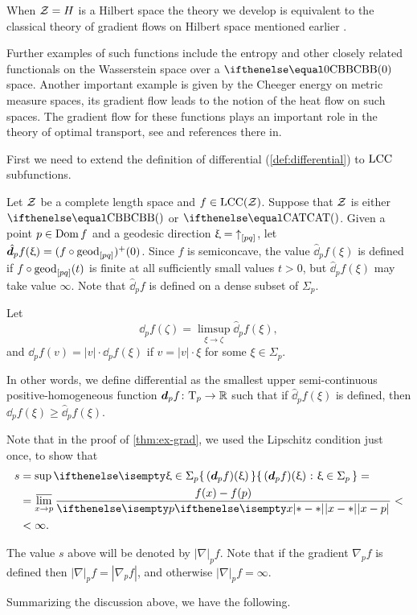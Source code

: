 When $\mathcal{Z}=H$ is a Hilbert space the theory we develop is equivalent to the classical theory of gradient flows on Hilbert space mentioned earlier \cite{Brezis-book}.

Further examples of such functions include the entropy and other closely related functionals on the Wasserstein space over a $\Alex0$ space.
Another important example is given by the Cheeger energy on metric measure spaces, its gradient flow leads to the notion of the heat flow on such spaces.
The gradient flow for these functions plays an important role in the theory of optimal transport, see \cite{villani} and references there in. 


First we need to extend the definition of differential (\ref{def:differential}) to $\mathrm{LCC}$ subfunctions.

Let $\mathcal{Z}$ be a complete length space and $f\in\LSCSC(\spc{Z})$.
Suppose that $\mathcal{Z}$ is either $\Alex{}$ or $\CAT{}$.
Given a point $p\in \Dom f$ and a geodesic direction $\upxi={\uparrow}_{[{p}{q}]}$, 
let 
$\hat \dd_pf(\xi)=(f\circ\geod_{[pq]})^+(0)$.
Since $f$ is semiconcave, the value $\hat \dd_pf(\xi)$ is defined if $f\circ\geod_{[pq]}(t)$ is finite at all sufficiently small values $t>0$,
but $\hat \dd_pf(\xi)$ may take value $\infty$. 
Note that $\hat \dd_pf$ is defined on a dense subset of $\Sigma_p$.

Let 
\[\dd_pf(\zeta)=\limsup_{\xi\to\zeta}\hat\dd_pf(\xi),\]
and $\dd_pf(v)=|v|\cdot \dd_pf(\xi)$ if $v=|v|\cdot\xi$ for some $\xi\in\Sigma_p$.

In other words, we define differential as the smallest 
upper semi-continuous  positive-homogeneous function $\dd_pf\:\T_p\to\RR$
such that if $\hat\dd_pf(\xi)$ is defined, then $\dd_pf(\xi)\ge \hat \dd_pf(\xi)$.



Note that in the proof of \ref{thm:ex-grad}, 
we used the Lipschitz condition just once,
to show that 
\begin{align*}
s&=\sup\set{(\dd_p f)(\xi)}{\xi\in\Sigma_p}=
\\
&=\limsup_{x\to p}\frac{f(x)-f(p)}{\dist{x}{p}{}}<
\\
&<\infty.
\end{align*}


The value $s$ above will be denoted by $|\nabla|_pf$.
Note that 
if the gradient $\nabla_pf$ is defined then $|\nabla|_pf=|\nabla_pf|$,
and otherwise $|\nabla|_pf=\infty$.

Summarizing the discussion above, 
we have the following.

